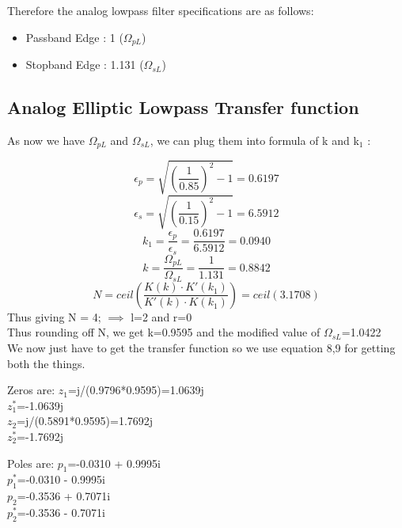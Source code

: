\documentclass{article}
\begin{document}
\vspace{1em}
\noindent
Therefore the analog lowpass filter specifications are as follows:
\begin{itemize}
    \item Passband Edge : 1 ($\Omega_{pL}$)
    \item Stopband Edge : 1.131 ($\Omega_{sL}$)
\end{itemize}

\subsection{Analog Elliptic Lowpass Transfer function}
As now we have $\Omega_{pL}$ and $\Omega_{sL}$, we can plug them into formula of k and k$_1$ :

\begin{equation*}
    \epsilon_p=\sqrt{(\frac{1}{0.85})^2-1}=0.6197 
\end{equation*}
\begin{equation*}
    \epsilon_s=\sqrt{(\frac{1}{0.15})^2-1}=6.5912 
\end{equation*}
\begin{equation*}
    k_1 = \frac{\epsilon_p}{\epsilon_s} = \frac{0.6197}{6.5912}=0.0940
\end{equation*}
\begin{equation*}
    k = \frac{\Omega_{pL}}{\Omega_{sL}} = \frac{1}{1.131} = 0.8842
\end{equation*}
\begin{equation*}
N = ceil({\frac{K(k)\cdot K'(k_1)}{K'(k)\cdot K(k_1)}}) = ceil(3.1708)
\end{equation*}
Thus giving N = 4; $\implies$ l=2 and r=0\\

Thus rounding off N, we get k=0.9595 and the modified value of $\Omega_{sL}$=1.0422\\

We now just have to get the transfer function so we use equation 8,9 for getting both the things.\\
\begin{center}
Zeros are:
$z_1$=j/(0.9796*0.9595)=1.0639j\\
$z_1^*$=-1.0639j \\
$z_2$=j/(0.5891*0.9595)=1.7692j\\
$z_2^*$=-1.7692j \\
\end{center}
\begin{center}
Poles are:
$p_1$=-0.0310 + 0.9995i \\    
$p_1^*$=-0.0310 - 0.9995i \\
$p_2$=-0.3536 + 0.7071i \\
$p_2^*$=-0.3536 - 0.7071i \\
\end{center}
\end{document}
